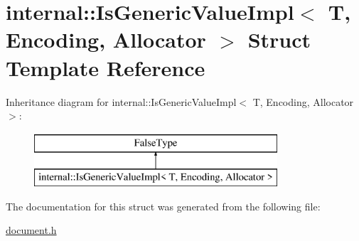 \hypertarget{a00185}{}\section{internal\+:\+:Is\+Generic\+Value\+Impl$<$ T, Encoding, Allocator $>$ Struct Template Reference}
\label{a00185}
Inheritance diagram for internal\+:\+:Is\+Generic\+Value\+Impl$<$ T, Encoding, Allocator $>$\+:\begin{figure}[H]
\begin{center}
\leavevmode
\includegraphics[height=2.000000cm]{a00185}
\end{center}
\end{figure}


The documentation for this struct was generated from the following file\+:\begin{DoxyCompactItemize}
\item 
\hyperlink{a00473}{document.\+h}\end{DoxyCompactItemize}
